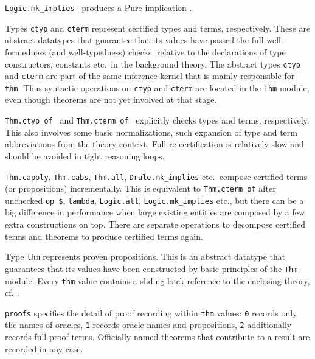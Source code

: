 \begin{isabellebody}
\begin{isamarkuptext}
\begin{description}
  \item \verb|Logic.mk_implies|~ produces a Pure
  implication .

  \item Types \verb|ctyp| and \verb|cterm| represent certified
  types and terms, respectively.  These are abstract datatypes that
  guarantee that its values have passed the full well-formedness (and
  well-typedness) checks, relative to the declarations of type
  constructors, constants etc.\ in the background theory.  The
  abstract types \verb|ctyp| and \verb|cterm| are part of the
  same inference kernel that is mainly responsible for \verb|thm|.
  Thus syntactic operations on \verb|ctyp| and \verb|cterm|
  are located in the \verb|Thm| module, even though theorems are
  not yet involved at that stage.

  \item \verb|Thm.ctyp_of|~ and \verb|Thm.cterm_of|~ explicitly checks types and terms,
  respectively.  This also involves some basic normalizations, such
  expansion of type and term abbreviations from the theory context.
  Full re-certification is relatively slow and should be avoided in
  tight reasoning loops.

  \item \verb|Thm.capply|, \verb|Thm.cabs|, \verb|Thm.all|, \verb|Drule.mk_implies| etc.\ compose certified terms (or propositions)
  incrementally.  This is equivalent to \verb|Thm.cterm_of| after
  unchecked \verb|op $|, \verb|lambda|, \verb|Logic.all|, \verb|Logic.mk_implies| etc., but there can be a big difference in
  performance when large existing entities are composed by a few extra
  constructions on top.  There are separate operations to decompose
  certified terms and theorems to produce certified terms again.

  \item Type \verb|thm| represents proven propositions.  This is
  an abstract datatype that guarantees that its values have been
  constructed by basic principles of the \verb|Thm| module.
  Every \verb|thm| value contains a sliding back-reference to the
  enclosing theory, cf.\ .

  \item \verb|proofs| specifies the detail of proof recording within
  \verb|thm| values: \verb|0| records only the names of oracles,
  \verb|1| records oracle names and propositions, \verb|2| additionally
  records full proof terms.  Officially named theorems that contribute
  to a result are recorded in any case.


\end{description}
\end{isamarkuptext}
\end{isabellebody}

